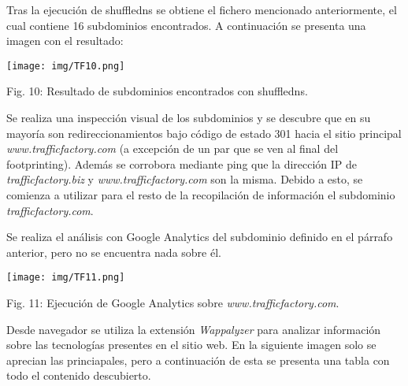 \documentclass[12pt,oneside,a4paper]{book}
\begin{document}
\vspace{2em}

\hspace{20pt}
Tras la ejecución de shuffledns se obtiene el fichero mencionado anteriormente, el cual contiene 16 subdominios encontrados. A continuación se presenta una imagen con el resultado:

\vspace{2em}

\begin{center}
	\texttt{[image: img/TF10.png]}
    
\vspace{0.1em}
    
    Fig. 10: Resultado de subdominios encontrados con shuffledns.
\end{center}

\vspace{2em}

\hspace{20pt}
Se realiza una inspección visual de los subdominios y se descubre que en su mayoría son redireccionamientos bajo código de estado 301 hacia el sitio principal \textit{www.trafficfactory.com} (a excepción de un par que se ven al final del footprinting). Además se corrobora mediante ping que la dirección IP de \textit{trafficfactory.biz} y \textit{www.trafficfactory.com} son la misma. Debido a esto, se comienza a utilizar para el resto de la recopilación de información el subdominio \textit{trafficfactory.com}.

\vspace{1em}

\hspace{20pt}
Se realiza el análisis con Google Analytics del subdominio definido en el párrafo anterior, pero no se encuentra nada sobre él.

\vspace{2em}

\begin{center}
	\texttt{[image: img/TF11.png]}
    
\vspace{0.1em}
    
    Fig. 11: Ejecución de Google Analytics sobre \textit{www.trafficfactory.com}.
\end{center}

\vspace{2em}

\hspace{20pt}
Desde navegador se utiliza la extensión \textit{Wappalyzer} para analizar información sobre las tecnologías presentes en el sitio web. En la siguiente imagen solo se aprecian las princiapales, pero a continuación de esta se presenta una tabla con todo el contenido descubierto.
\end{document}
